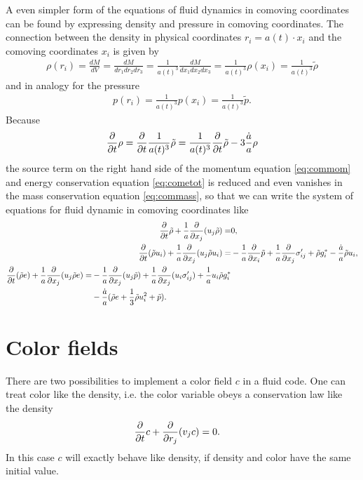A even simpler form of the equations of fluid dynamics in comoving coordinates
can be found by expressing density and pressure in comoving coordinates.
The connection between the density in physical coordinates
$r_i=a(t) \cdot x_i$ and the comoving coordinates $x_i$ is given by
\begin{align}
\rho(r_i)=\frac{dM}{dV}=\frac{dM}{dr_1 dr_2 dr_3}
=\frac{1}{a(t)^3}\frac{dM}{dx_1 dx_2 dx_3}=\frac{1}{a(t)^3}
\rho(x_i)=\frac{1}{a(t)^3}\tilde{\rho}
\end{align}
and in analogy for the pressure
\begin{align}
p(r_i)=\frac{1}{a(t)^3} p(x_i)= \frac{1}{a(t)^3}\tilde{p}.
\end{align}
Because
\begin{align}
\frac{\partial}{\partial t}\rho = \frac{\partial}{\partial t}\frac{1}{a(t)^3}\tilde{\rho} =
\frac{1}{a(t)^3}\frac{\partial}{\partial t}\tilde{\rho} - 3 \frac{\dot{a}}{a}\rho 
\end{align}
the source term on the right hand side of the momentum equation
\eqref{eq:commom} and energy conservation equation \eqref{eq:cometot} is reduced
and even vanishes in the mass conservation equation \eqref{eq:commass}, so that
we can write the system of equations for fluid dynamic in comoving coordinates
like
\begin{align}
\frac{\partial}{\partial t}\tilde{\rho} + \frac{1}{a}\frac{\partial}{\partial x_j}(u_j \tilde{\rho}) =& 0, \label{eq:commass2}\\
\frac{\partial}{\partial t}(\tilde{\rho} u_i) + \frac{1}{a}\frac{\partial}{\partial x_j}(u_j \tilde{\rho} u_i) =& 
-\frac{1}{a}\frac{\partial}{\partial x_i}\tilde{p}+ \frac{1}{a}\frac{\partial}{\partial x_j}\sigma'_{ij} 
+\tilde{\rho} g^*_i - \frac{\dot{a}}{a} \tilde{\rho} u_i,
\label{eq:commom2}
\\
\begin{split}
\frac{\partial}{\partial t}(\tilde{\rho} e) + \frac{1}{a}\frac{\partial}{\partial x_j}(u_j \tilde{\rho} e) =& 
-\frac{1}{a}\frac{\partial}{\partial x_j}(u_j \tilde{p}) + \frac{1}{a}\frac{\partial}{\partial x_j}(u_i \sigma'_{ij}) 
+ \frac{1}{a} u_i \tilde{\rho} g^*_i \\ 
&- \frac{\dot{a}}{a}(\tilde{\rho} e 
+\frac{1}{3}\tilde{\rho}u^2_i+\tilde{p}).\label{eq:cometot2}
\end{split}
\end{align}

\chapter{Color fields}\label{color}
There are two possibilities to implement a color field $c$ in a fluid code. One
can treat color like the density, i.e. the color variable obeys a conservation
law like the density
\begin{align}
\frac{\partial}{\partial t} c + \frac{\partial}{\partial r_j}(v_j c) &= 0.
\end{align}
In this case $c$ will exactly behave like density, if density and color have
the same initial value.

